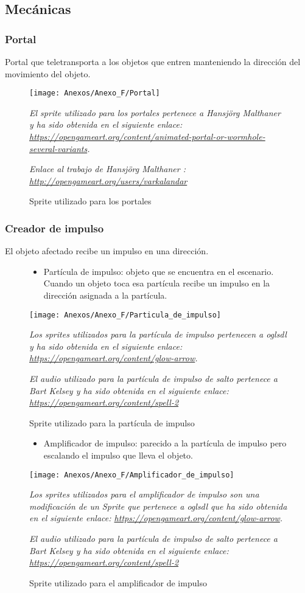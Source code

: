 \subsection{Mecánicas}
\subsubsection{Portal}
Portal que teletransporta a los objetos que entren manteniendo la dirección del movimiento del objeto.

\begin{figure}[h]
\centering
\texttt{[image: Anexos/Anexo\_F/Portal]}
\caption{Sprite utilizado para los portales}
\raggedright
\textit{El sprite utilizado para los portales pertenece a Hansjörg Malthaner y ha sido obtenida en el siguiente enlace: \url{https://opengameart.org/content/animated-portal-or-wormhole-several-variants}.}

\textit{Enlace al trabajo de Hansjörg Malthaner : \url{http://opengameart.org/users/varkalandar}}
\end{figure}

\subsubsection{Creador de impulso}
El objeto afectado recibe un impulso en una dirección.
\begin{figure}[h]
\begin{itemize}
\item
Partícula de impulso: objeto que se encuentra en el escenario. Cuando un objeto toca esa partícula recibe un impulso en la dirección asignada a la partícula.
\end{itemize}
\centering
\texttt{[image: Anexos/Anexo\_F/Particula\_de\_impulso]}
\caption{Sprite utilizado para la partícula de impulso}
\raggedright
\textit{Los sprites utilizados para la partícula de impulso pertenecen a oglsdl y ha sido obtenida en el siguiente enlace: \url{https://opengameart.org/content/glow-arrow}.}

\textit{El audio utilizado para la partícula de impulso de salto pertenece a Bart Kelsey y ha sido obtenida en el siguiente enlace: \url{https://opengameart.org/content/spell-2}}
\end{figure}

\begin{figure}[h]
\begin{itemize}
\item
Amplificador de impulso: parecido a la partícula de impulso pero escalando el impulso que lleva el objeto.
\end{itemize}
\centering
\texttt{[image: Anexos/Anexo\_F/Amplificador\_de\_impulso]}
\caption{Sprite utilizado para el amplificador de impulso}
\raggedright
\textit{Los sprites utilizados para el amplificador de impulso son una modificación de un Sprite que pertenece a oglsdl que ha sido obtenida en el siguiente enlace: \url{https://opengameart.org/content/glow-arrow}.}

\textit{El audio utilizado para la partícula de impulso de salto pertenece a Bart Kelsey y ha sido obtenida en el siguiente enlace: \url{https://opengameart.org/content/spell-2}}
\end{figure}

